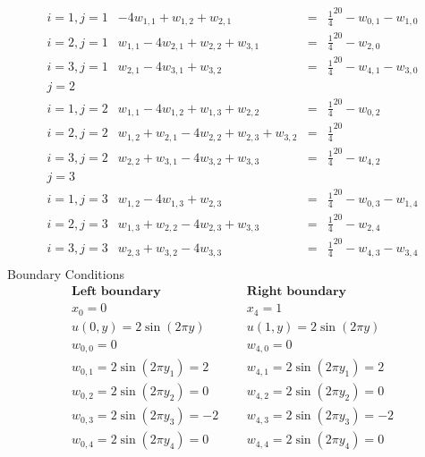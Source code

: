 \[\begin{array}{l|rcl}
i=1,j=1&-4w_{1,1}+w_{1,2}+w_{2,1}&=&\frac{1}{4}^20-w_{0,1}-w_{1,0}\\
i=2,j=1&w_{1,1}-4w_{2,1}+w_{2,2}+w_{3,1}&=&\frac{1}{4}^20-w_{2,0}\\
i=3,j=1&w_{2,1}-4w_{3,1}+w_{3,2}&=&\frac{1}{4}^20-w_{4,1}-w_{3,0}\\
j=2\\
i=1,j=2&w_{1,1}-4w_{1,2}+w_{1,3}+w_{2,2}&=&\frac{1}{4}^20-w_{0,2}\\
i=2,j=2&w_{1,2}+w_{2,1}-4w_{2,2}+w_{2,3}+w_{3,2}&=&\frac{1}{4}^20\\
i=3,j=2&w_{2,2}+w_{3,1}-4w_{3,2}+w_{3,3}&=&\frac{1}{4}^20-w_{4,2}\\
j=3\\
i=1,j=3&w_{1,2}-4w_{1,3}+w_{2,3}&=&\frac{1}{4}^20-w_{0,3}-w_{1,4}\\
i=2,j=3&w_{1,3}+w_{2,2}-4w_{2,3}+w_{3,3}&=&\frac{1}{4}^20-w_{2,4}\\
i=3,j=3&w_{2,3}+w_{3,2}-4w_{3,3}&=&\frac{1}{4}^20-w_{4,3}-w_{3,4}\\
\end{array}
\]	
Boundary Conditions
\[
\begin{array}{lcl}
\textbf{Left boundary}&\ \ \ & \textbf{Right boundary}\\ 
x_0=0&\ \ \ & x_4=1\\ 
u(0,y)=2\sin(2\pi y)&\ \ \ & u(1,y)=2\sin(2\pi y)\\

w_{0,0}=0 &\ \ \ & w_{4,0}=0\\ 
w_{0,1}=2\sin(2\pi y_1) =2 & \ \ \ & w_{4,1}=2\sin(2\pi y_1) =2\\

w_{0,2}=2\sin(2\pi y_2) =0 & \ \ \ & w_{4,2}=2\sin(2\pi y_2) =0\\

w_{0,3}=2\sin(2\pi y_3) =-2 & \ \ \ & w_{4,3}=2\sin(2\pi y_3) =-2\\

w_{0,4}=2\sin(2\pi y_4) =0 & \ \ \ & w_{4,4}=2\sin(2\pi y_4) =0\\

\end{array}
\]
